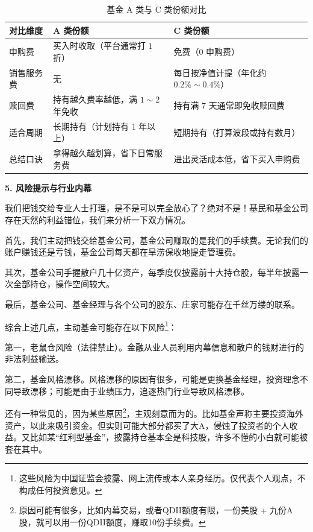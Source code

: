 \documentclass[12pt,openany]{book}
\newcommand{\subhead}[1]{%
    \par\vspace{0.5\baselineskip}%
    \noindent\textbf{#1}\par%
    \vspace{0.5\baselineskip}%
}
\begin{document}
\begin{table}[tbp]
\centering
\singlespacing
\caption{基金 A 类与 C 类份额对比}
\label{tab:share_classes}
\small
\renewcommand{\arraystretch}{1.2}
\begin{tabularx}{\linewidth}{|>{\centering\arraybackslash\hsize=0.7\hsize}X|>{\centering\arraybackslash\hsize=1.15\hsize}X|>{\centering\arraybackslash\hsize=1.15\hsize}X|}
\hline
对比维度 & A 类份额 & C 类份额 \\ \hline
申购费 & 买入时收取（平台通常打 $1$ 折） & 免费（0 申购费） \\ \hline
销售服务费 & 无 & 每日按净值计提（年化约 $0.2\%\sim 0.4\%$） \\ \hline
赎回费 & 持有越久费率越低，满 $1\sim 2$ 年免收 & 持有满 7 天通常即免收赎回费 \\ \hline
适合周期 & 长期持有（计划持有 1 年以上） & 短期持有（打算波段或持有数月） \\ \hline
总结口诀 & 拿得越久越划算，省下日常服务费 & 进出灵活成本低，省下买入申购费 \\ \hline
\end{tabularx}
\end{table}

\subhead{5. 风险提示与行业内幕}

我们把钱交给专业人士打理，是不是可以完全放心了？绝对不是！基民和基金公司存在天然的利益错位，我们来分析一下双方情况。

首先，我们主动把钱交给基金公司，基金公司赚取的是我们的手续费。无论我们的账户赚钱还是亏钱，基金公司每天都在旱涝保收地提走管理费。

其次，基金公司手握散户几十亿资产，每季度仅披露前十大持仓股，每半年披露一次全部持仓，操作空间较大。

最后，基金公司、基金经理与各个公司的股东、庄家可能存在千丝万缕的联系。

综合上述几点，主动基金可能存在以下风险\footnote{这些风险为中国证监会披露、网上流传或本人亲身经历。仅代表个人观点，不构成任何投资意见。}：

第一，老鼠仓风险（法律禁止）。金融从业人员利用内幕信息和散户的钱财进行的非法利益输送。

第二，基金风格漂移。风格漂移的原因有很多，可能是更换基金经理，投资理念不同导致漂移；可能是由于业绩压力，追逐热门行业导致风格漂移。

还有一种常见的，因为某些原因\footnote{原因可能有很多，比如内幕交易，或者QDII额度有限，一份美股 + 九份A股，就可以用一份QDII额度，赚取10份手续费。}，主观刻意而为的。比如基金声称主要投资海外资产，以此来吸引资金。但实则可能大部分都买了大A，侵蚀了投资者的个人收益。又比如某“红利型基金”，披露持仓基本全是科技股，许多不懂的小白就可能被套在其中。
\end{document}

